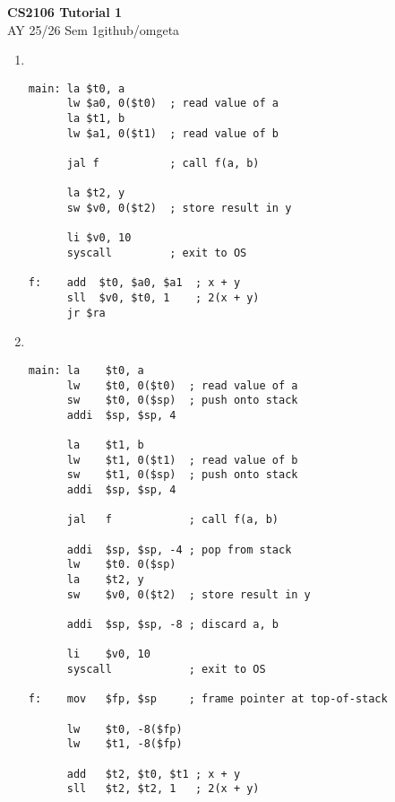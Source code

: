 \documentclass[12pt, a4paper]{article}
\newcommand{\mytitle}{CS2106 Tutorial 1}
\newcommand{\myauthor}{github/omgeta}
\newcommand{\mydate}{AY 25/26 Sem 1}
\begin{document}
\raggedright
\footnotesize
\begin{center}
{\normalsize{\textbf{\mytitle}}} \\
{\footnotesize{\mydate\hspace{2pt}\textemdash\hspace{2pt}\myauthor}}
\end{center}
\begin{enumerate}[Q\arabic*.]
  \item \quad\\ 
    \begin{lstlisting}
main: la $t0, a
      lw $a0, 0($t0)  ; read value of a
      la $t1, b 
      lw $a1, 0($t1)  ; read value of b

      jal f           ; call f(a, b)

      la $t2, y
      sw $v0, 0($t2)  ; store result in y

      li $v0, 10  
      syscall         ; exit to OS

f:    add  $t0, $a0, $a1  ; x + y
      sll  $v0, $t0, 1    ; 2(x + y)
      jr $ra
    \end{lstlisting}

  \item \quad\\ 
    \begin{lstlisting}
main: la    $t0, a
      lw    $t0, 0($t0)  ; read value of a
      sw    $t0, 0($sp)  ; push onto stack
      addi  $sp, $sp, 4

      la    $t1, b 
      lw    $t1, 0($t1)  ; read value of b
      sw    $t1, 0($sp)  ; push onto stack
      addi  $sp, $sp, 4
      
      jal   f            ; call f(a, b)

      addi  $sp, $sp, -4 ; pop from stack
      lw    $t0. 0($sp)
      la    $t2, y
      sw    $v0, 0($t2)  ; store result in y

      addi  $sp, $sp, -8 ; discard a, b

      li    $v0, 10  
      syscall            ; exit to OS

f:    mov   $fp, $sp     ; frame pointer at top-of-stack
      
      lw    $t0, -8($fp)
      lw    $t1, -8($fp)

      add   $t2, $t0, $t1 ; x + y
      sll   $t2, $t2, 1   ; 2(x + y)


\end{lstlisting}
\end{enumerate}
\end{document}
